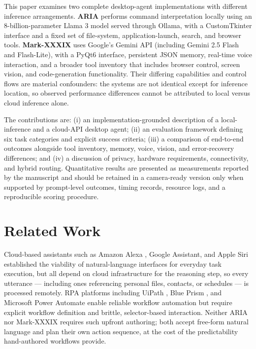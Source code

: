 \documentclass[conference]{IEEEtran}
\begin{document}
This paper examines two complete desktop-agent implementations with different inference arrangements. \textbf{ARIA} performs command interpretation locally using an 8-billion-parameter Llama 3 model served through Ollama, with a CustomTkinter interface and a fixed set of file-system, application-launch, search, and browser tools. \textbf{Mark-XXXIX} uses Google's Gemini API \cite{ref12} (including Gemini 2.5 Flash and Flash-Lite), with a PyQt6 interface, persistent JSON memory, real-time voice interaction, and a broader tool inventory that includes browser control, screen vision, and code-generation functionality. Their differing capabilities and control flows are material confounders: the systems are not identical except for inference location, so observed performance differences cannot be attributed to local versus cloud inference alone.

The contributions are: (i) an implementation-grounded description of a local-inference and a cloud-API desktop agent; (ii) an evaluation framework defining six task categories and explicit success criteria; (iii) a comparison of end-to-end outcomes alongside tool inventory, memory, voice, vision, and error-recovery differences; and (iv) a discussion of privacy, hardware requirements, connectivity, and hybrid routing. Quantitative results are presented as measurements reported by the manuscript and should be retained in a camera-ready version only when supported by prompt-level outcomes, timing records, resource logs, and a reproducible scoring procedure.

\section{Related Work}

Cloud-based assistants such as Amazon Alexa \cite{ref1}, Google Assistant, and Apple Siri established the viability of natural-language interfaces for everyday task execution, but all depend on cloud infrastructure for the reasoning step, so every utterance --- including ones referencing personal files, contacts, or schedules --- is processed remotely. RPA platforms including UiPath \cite{ref3}, Blue Prism \cite{ref14}, and Microsoft Power Automate \cite{ref15} enable reliable workflow automation but require explicit workflow definition and brittle, selector-based interaction. Neither ARIA nor Mark-XXXIX requires such upfront authoring; both accept free-form natural language and plan their own action sequence, at the cost of the predictability hand-authored workflows provide.
\end{document}
